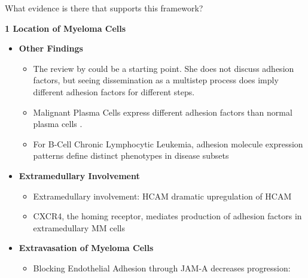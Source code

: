 What evidence is there that supports this framework?





\textbf{1 Location of Myeloma Cells}
\begin{itemize}
      \item \textbf{Other Findings}
            \begin{itemize}
                  \item The review by
                        \citet{zeissigTumourDisseminationMultiple2020} could be a
                        starting point. She does not discuss adhesion factors, but
                        seeing dissemination as a multistep process does imply
                        different adhesion factors for different steps.
                  \item Malignant Plasma Cells express different adhesion factors
                        than normal plasma cells \cite{cookRoleAdhesionMolecules1997, bouzerdanAdhesionMoleculesMultiple2022}.
                  \item For B-Cell Chronic Lymphocytic Leukemia, adhesion
                        molecule expression patterns define distinct phenotypes in
                        disease subsets \cite{derossiAdhesionMoleculeExpression1993}
            \end{itemize}

      \item \textbf{Extramedullary Involvement}
            \begin{itemize}
                  \item Extramedullary involvement: HCAM dramatic upregulation of HCAM
                  \item CXCR4, the homing receptor, mediates production of
                        adhesion factors in extramedullary MM cells \cite{roccaroCXCR4RegulatesExtraMedullary2015}
            \end{itemize}

      \item \textbf{Extravasation of Myeloma Cells}
            \begin{itemize}
                  \item Blocking Endothelial Adhesion through JAM-A decreases progression: \cite{solimandoHaltingViciousCycle2020}


\end{itemize}
\end{itemize}
